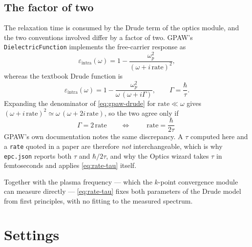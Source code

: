 \subsection{The factor of two}

The relaxation time is consumed by the Drude term of the optics module, and the
two conventions involved differ by a factor of two. GPAW's
\texttt{DielectricFunction} implements the free-carrier response as
\begin{equation}
  \varepsilon_{\mathrm{intra}}(\omega)
    = 1 - \frac{\omega_p^2}{(\omega + i\,\mathrm{rate})^2} ,
  \label{eq:gpaw-drude}
\end{equation}
whereas the textbook Drude function is
\begin{equation}
  \varepsilon_{\mathrm{intra}}(\omega)
    = 1 - \frac{\omega_p^2}{\omega\,(\omega + i\Gamma)} ,
  \qquad \Gamma = \frac{\hbar}{\tau} .
  \label{eq:textbook-drude}
\end{equation}
Expanding the denominator of \eqref{eq:gpaw-drude} for
$\mathrm{rate} \ll \omega$ gives
$(\omega + i\,\mathrm{rate})^2 \simeq \omega\,(\omega + 2i\,\mathrm{rate})$, so
the two agree only if
\begin{equation}
  \Gamma = 2\,\mathrm{rate}
  \qquad\Longleftrightarrow\qquad
  \boxed{\;\mathrm{rate} = \frac{\hbar}{2\tau}\;}
  \label{eq:rate-tau}
\end{equation}
GPAW's own documentation notes the same discrepancy. A $\tau$ computed here and
a \texttt{rate} quoted in a paper are therefore \emph{not} interchangeable,
which is why \texttt{epc.json} reports both $\tau$ and $\hbar/2\tau$, and why
the Optics wizard takes $\tau$ in femtoseconds and applies
\eqref{eq:rate-tau} itself.

Together with the plasma frequency --- which the $k$-point convergence module
can measure directly --- \eqref{eq:rate-tau} fixes both parameters of the Drude
model from first principles, with no fitting to the measured spectrum.

\section{Settings}
\label{sec:elph-settings}

